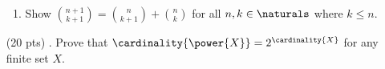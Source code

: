 \begin{enumerate}
\begin{enumerate}
      \item
        Show $\binom{n + 1}{k + 1} = \binom{n}{k + 1} + \binom{n}{k}$ for all $n, k \in \naturals$ where $k \leq n$.

    \end{enumerate}

  \item[(20 pts) \quad 6.]
    Prove that $\cardinality{\power{X}} = 2^{\cardinality{X}}$ for any finite set $X$.

\end{enumerate}


